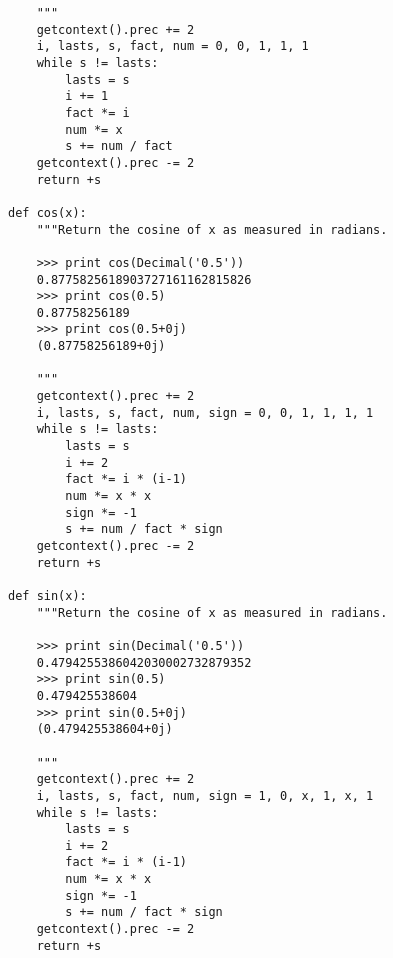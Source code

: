 \begin{verbatim}
    """
    getcontext().prec += 2
    i, lasts, s, fact, num = 0, 0, 1, 1, 1
    while s != lasts:
        lasts = s    
        i += 1
        fact *= i
        num *= x     
        s += num / fact   
    getcontext().prec -= 2        
    return +s

def cos(x):
    """Return the cosine of x as measured in radians.

    >>> print cos(Decimal('0.5'))
    0.8775825618903727161162815826
    >>> print cos(0.5)
    0.87758256189
    >>> print cos(0.5+0j)
    (0.87758256189+0j)
    
    """
    getcontext().prec += 2
    i, lasts, s, fact, num, sign = 0, 0, 1, 1, 1, 1
    while s != lasts:
        lasts = s    
        i += 2
        fact *= i * (i-1)
        num *= x * x
        sign *= -1
        s += num / fact * sign 
    getcontext().prec -= 2        
    return +s

def sin(x):
    """Return the cosine of x as measured in radians.

    >>> print sin(Decimal('0.5'))
    0.4794255386042030002732879352
    >>> print sin(0.5)
    0.479425538604
    >>> print sin(0.5+0j)
    (0.479425538604+0j)
    
    """
    getcontext().prec += 2
    i, lasts, s, fact, num, sign = 1, 0, x, 1, x, 1
    while s != lasts:
        lasts = s    
        i += 2
        fact *= i * (i-1)
        num *= x * x
        sign *= -1
        s += num / fact * sign 
    getcontext().prec -= 2        
    return +s

\end{verbatim}                                             
